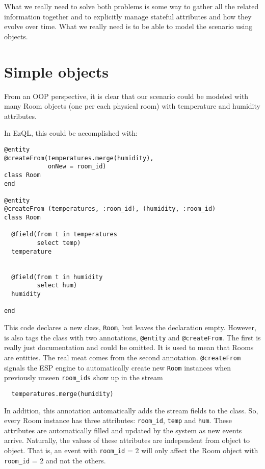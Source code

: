 \documentclass{report}
\begin{document}
What we really need to solve both problems is some way to gather all
the related information together and to explicitly manage stateful
attributes and how they evolve over time. What we really need is to be
able to model the scenario using objects.

\section{Simple objects}

From an OOP perspective, it is clear that our scenario could be
modeled with many Room objects (one per each physical room) with
temperature and humidity attributes.

In EzQL, this could be accomplished with:

\begin{verbatim}
@entity
@createFrom(temperatures.merge(humidity),
            onNew = room_id)
class Room
end

@entity
@createFrom (temperatures, :room_id), (humidity, :room_id)
class Room

  @field(from t in temperatures
         select temp)
  temperature


  @field(from t in humidity
         select hum)
  humidity

end
\end{verbatim}

This code declares a new class, \verb=Room=, but leaves the
declaration empty. However, is also tags the class with two
annotations, \verb=@entity= and \verb=@createFrom=. The first is
really just documentation and could be omitted. It is used to mean
that Rooms are entities. The real meat comes from the second
annotation. \verb=@createFrom= signals the ESP engine to automatically
create new \verb=Room= instances when previously unseen
\verb=room_ids= show up in the stream

\begin{verbatim}
  temperatures.merge(humidity)
\end{verbatim}

In addition, this annotation automatically adds the stream fields to
the class. So, every Room instance has three attributes:
\verb=room_id=, \verb=temp= and \verb=hum=. These attributes are
automatically filled and updated by the system as new events
arrive. Naturally, the values of these attributes are independent from
object to object. That is, an event with \verb=room_id= = 2 will only
affect the Room object with \verb=room_id= = 2 and not the others.
\end{document}
